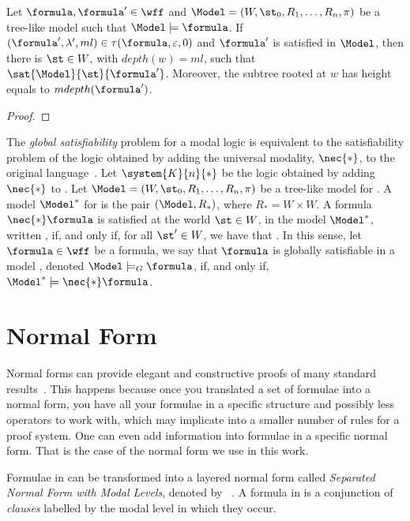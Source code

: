 \begin{example}
    \begin{theorem}
        Let $\formula, \formula' \in \wff$ and $\Model = (W, \st_0, R_1, \ldots,
        R_n, \pi)$ be a tree-like model such that $\Model \models \formula$. If
        $(\formula', \lambda', ml) \in \tau(\formula, \varepsilon, 0)$ and
        $\formula'$ is satisfied in $\Model$, then there is $\st \in W$, with
        $depth(w) = ml$, such that $\sat{\Model}{\st}{\formula'}$. Moreover,
        the subtree rooted at $w$ has height equals to $mdepth(\formula')$.
    \end{theorem}
    \begin{proof}
    \end{proof}
\end{example}

The \emph{global satisfiability} problem for a modal logic is equivalent to the
satisfiability problem of the logic obtained by adding the universal modality,
$\nec{*}$, to the original language~\cite{goranko1992using}. Let
$\system{K}{n}{*}$ be the logic obtained by adding $\nec{*}$ to .
Let $\Model = (W, \st_0, R_1, \ldots, R_n, \pi)$ be a tree-like model for
. A model $\Model^*$ for  is the pair $(\Model,
R_*)$, where $R_* = W \times W$. A formula $\nec{*} \formula$ is satisfied at
the world $\st \in W$, in the model $\Model^*$, written
\sat{\Model^*}{\st}{\nec{*}\formula}, if, and only if, for all $\st'
\in W$, we have that . In this sense, let $\formula
\in \wff$ be a formula, we say that $\formula$ is globally satisfiable in a
model \Model, denoted $\Model \models_G \formula$, if, and only if, $\Model^*
\models \nec{*} \formula$.

\section{Normal Form}

Normal forms can provide elegant and constructive proofs of many standard
results~\cite{fine1975}. This happens because once you translated a set of
formulae into a normal form, you have all your formulae in a specific structure
and possibly less operators to work with, which may implicate into a smaller number
of rules for a proof system. One can even add information into formulae in a
specific normal form. That is the case of the normal form we use in this work.

Formulae in  can be transformed into a layered normal form called
\emph{Separated Normal Form with Modal Levels}, denoted by
~\cite{journals/jal/NalonD07}. A formula in  is a
conjunction of \emph{clauses} labelled by the modal level in which they occur.

